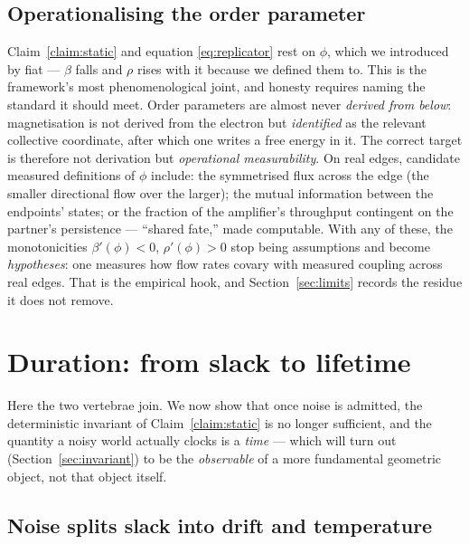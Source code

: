 \documentclass[11pt]{article}
\theoremstyle{plain}
\theoremstyle{definition}
\begin{document}
\subsection{Operationalising the order parameter}

Claim~\ref{claim:static} and equation \eqref{eq:replicator} rest on $\phi$, which we introduced by fiat --- $\beta$ falls and $\rho$ rises with it because we defined them to. This is the framework's most phenomenological joint, and honesty requires naming the standard it should meet. Order parameters are almost never \emph{derived from below}: magnetisation is not derived from the electron but \emph{identified} as the relevant collective coordinate, after which one writes a free energy in it. The correct target is therefore not derivation but \emph{operational measurability}. On real edges, candidate measured definitions of $\phi$ include: the symmetrised flux across the edge (the smaller directional flow over the larger); the mutual information between the endpoints' states; or the fraction of the amplifier's throughput contingent on the partner's persistence --- ``shared fate,'' made computable. With any of these, the monotonicities $\beta'(\phi) < 0$, $\rho'(\phi) > 0$ stop being assumptions and become \emph{hypotheses}: one measures how flow rates covary with measured coupling across real edges. That is the empirical hook, and Section~\ref{sec:limits} records the residue it does not remove.

\section{Duration: from slack to lifetime}
\label{sec:duration}

Here the two vertebrae join. We now show that once noise is admitted, the deterministic invariant of Claim~\ref{claim:static} is no longer sufficient, and the quantity a noisy world actually clocks is a \emph{time} --- which will turn out (Section~\ref{sec:invariant}) to be the \emph{observable} of a more fundamental geometric object, not that object itself.

\subsection{Noise splits slack into drift and temperature}
\end{document}
